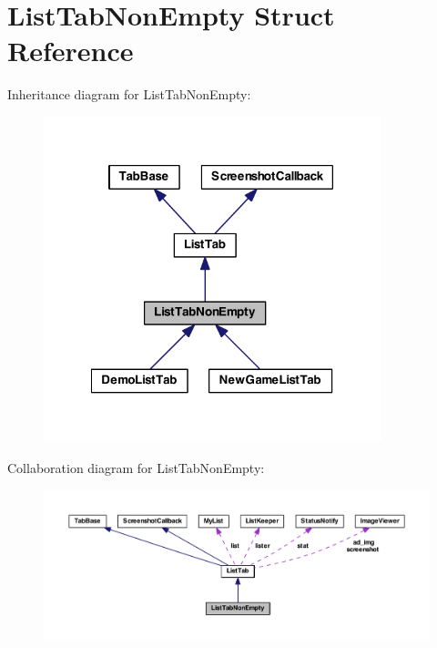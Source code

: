 \hypertarget{struct_list_tab_non_empty}{\section{List\-Tab\-Non\-Empty Struct Reference}
\label{struct_list_tab_non_empty}
}


Inheritance diagram for List\-Tab\-Non\-Empty\-:
\nopagebreak
\begin{figure}[H]
\begin{center}
\leavevmode
\includegraphics[width=278pt]{struct_list_tab_non_empty__inherit__graph}
\end{center}
\end{figure}


Collaboration diagram for List\-Tab\-Non\-Empty\-:
\nopagebreak
\begin{figure}[H]
\begin{center}
\leavevmode
\includegraphics[width=350pt]{struct_list_tab_non_empty__coll__graph}
\end{center}
\end{figure}
